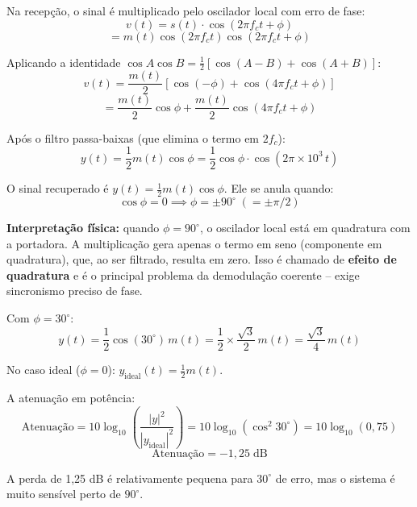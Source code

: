 \documentclass[11pt,a4paper]{article}
\begin{document}
\begin{resolucao}

Na recepção, o sinal é multiplicado pelo oscilador local com erro de fase:
\[
  v(t) = s(t) \cdot \cos(2\pi f_c t + \phi)
\]
\[
  = m(t)\cos(2\pi f_c t)\cos(2\pi f_c t + \phi)
\]

Aplicando a identidade $\cos A \cos B = \frac{1}{2}[\cos(A-B) + \cos(A+B)]$:
\[
  v(t) = \frac{m(t)}{2}\left[\cos(-\phi) + \cos(4\pi f_c t + \phi)\right]
\]
\[
  = \frac{m(t)}{2}\cos\phi + \frac{m(t)}{2}\cos(4\pi f_c t + \phi)
\]

Após o filtro passa-baixas (que elimina o termo em $2f_c$):
\[
  \boxed{y(t) = \frac{1}{2}m(t)\cos\phi = \frac{1}{2}\cos\phi \cdot \cos(2\pi \times 10^3\,t)}
\]
\end{resolucao}

\begin{resolucao}

O sinal recuperado é $y(t) = \frac{1}{2}m(t)\cos\phi$. Ele se anula quando:
\[
  \cos\phi = 0 \implies \boxed{\phi = \pm 90^\circ \;(= \pm\pi/2)}
\]

\textbf{Interpretação física:} quando $\phi = 90^\circ$, o oscilador local está em quadratura com a portadora. A multiplicação gera apenas o termo em seno (componente em quadratura), que, ao ser filtrado, resulta em zero. Isso é chamado de \textbf{efeito de quadratura} e é o principal problema da demodulação coerente -- exige sincronismo preciso de fase.
\end{resolucao}

\begin{resolucao}[Item d -- Atenuação para phi = 30 graus]

Com $\phi = 30^\circ$:
\[
  y(t) = \frac{1}{2}\cos(30^\circ)\,m(t) = \frac{1}{2} \times \frac{\sqrt{3}}{2}\,m(t) = \frac{\sqrt{3}}{4}\,m(t)
\]

No caso ideal ($\phi = 0$): $y_{\text{ideal}}(t) = \frac{1}{2}m(t)$.

A atenuação em potência:
\[
  \text{Atenuação} = 10\log_{10}\!\left(\frac{|y|^2}{|y_{\text{ideal}}|^2}\right) = 10\log_{10}(\cos^2 30^\circ) = 10\log_{10}(0{,}75)
\]
\[
  \boxed{\text{Atenuação} = -1{,}25\;\text{dB}}
\]

A perda de 1,25 dB é relativamente pequena para $30^\circ$ de erro, mas o sistema é muito sensível perto de $90^\circ$.
\end{resolucao}


\end{document}
